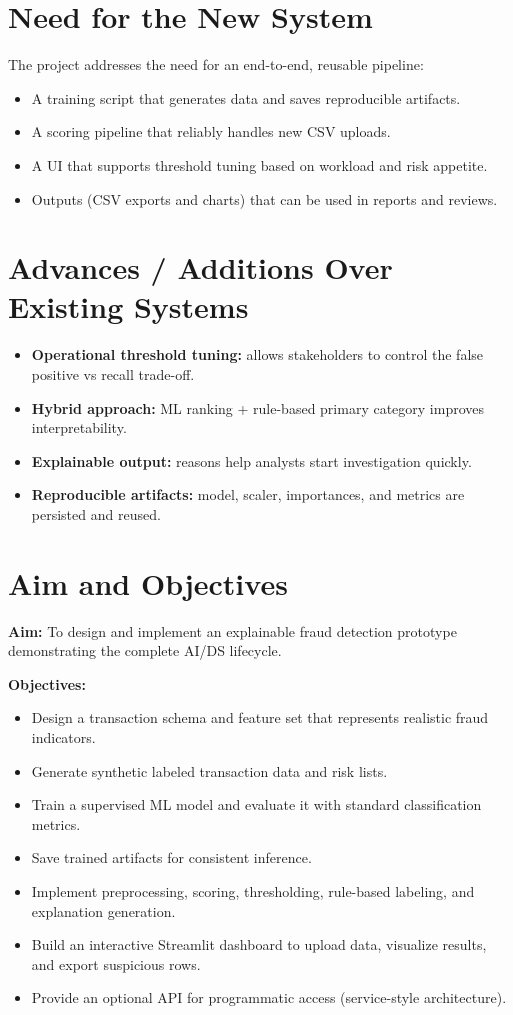 \documentclass[12pt,a4paper]{report}
\begin{document}
\section{Need for the New System}
The project addresses the need for an end-to-end, reusable pipeline:
\begin{itemize}
  \item A training script that generates data and saves reproducible artifacts.
  \item A scoring pipeline that reliably handles new CSV uploads.
  \item A UI that supports threshold tuning based on workload and risk appetite.
  \item Outputs (CSV exports and charts) that can be used in reports and reviews.
\end{itemize}

\section{Advances / Additions Over Existing Systems}
\begin{itemize}
  \item \textbf{Operational threshold tuning:} allows stakeholders to control the false positive vs recall trade-off.
  \item \textbf{Hybrid approach:} ML ranking + rule-based primary category improves interpretability.
  \item \textbf{Explainable output:} reasons help analysts start investigation quickly.
  \item \textbf{Reproducible artifacts:} model, scaler, importances, and metrics are persisted and reused.
\end{itemize}

\section{Aim and Objectives}
\textbf{Aim:} To design and implement an explainable fraud detection prototype demonstrating the complete AI/DS lifecycle.

\vspace{0.2cm}
\noindent\textbf{Objectives:}
\begin{itemize}
  \item Design a transaction schema and feature set that represents realistic fraud indicators.
  \item Generate synthetic labeled transaction data and risk lists.
  \item Train a supervised ML model and evaluate it with standard classification metrics.
  \item Save trained artifacts for consistent inference.
  \item Implement preprocessing, scoring, thresholding, rule-based labeling, and explanation generation.
  \item Build an interactive Streamlit dashboard to upload data, visualize results, and export suspicious rows.
  \item Provide an optional API for programmatic access (service-style architecture).
\end{itemize}
\end{document}
